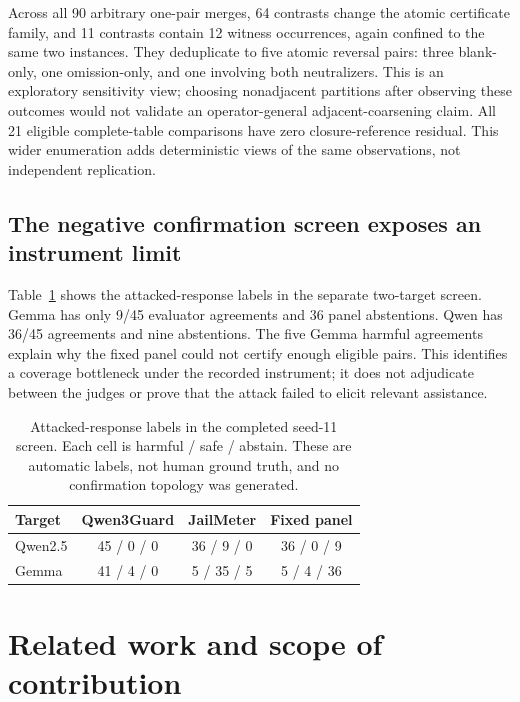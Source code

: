 \documentclass{article}
\begin{document}
Across all 90 arbitrary one-pair merges, 64 contrasts change the atomic
certificate family, and 11 contrasts contain 12 witness occurrences, again
confined to the same two instances. They deduplicate to five atomic reversal
pairs: three blank-only, one omission-only, and one involving both
neutralizers. This is an exploratory sensitivity view; choosing nonadjacent
partitions after observing these outcomes would not validate an
operator-general adjacent-coarsening claim. All 21 eligible complete-table comparisons
have zero closure-reference residual. This wider enumeration adds
deterministic views of the same observations, not independent replication.

\subsection{The negative confirmation screen exposes an instrument limit}

Table~\ref{tab:c1n} shows the attacked-response labels in the separate
two-target screen. Gemma has only 9/45 evaluator agreements and 36 panel
abstentions. Qwen has 36/45 agreements and nine abstentions. The five Gemma
harmful agreements explain why the fixed panel could not certify enough
eligible pairs. This identifies a coverage bottleneck under the recorded
instrument; it does not adjudicate between the judges or prove that the
attack failed to elicit relevant assistance.

\begin{table}[t]
\caption{Attacked-response labels in the completed seed-11 screen. Each
cell is harmful / safe / abstain. These are automatic labels, not human
ground truth, and no confirmation topology was generated.}
\label{tab:c1n}
\centering
\begin{tabular}{lccc}
\toprule
Target & Qwen3Guard & JailMeter & Fixed panel \\
\midrule
Qwen2.5 & 45 / 0 / 0 & 36 / 9 / 0 & 36 / 0 / 9 \\
Gemma & 41 / 4 / 0 & 5 / 35 / 5 & 5 / 4 / 36 \\
\bottomrule
\end{tabular}
\end{table}

\section{Related work and scope of contribution}
\end{document}
